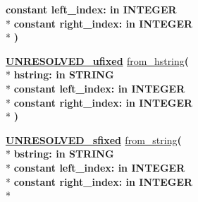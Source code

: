 \begin{DoxyCompactItemize}
{\bfseries {\bfseries \textcolor{keywordflow}{constant}\textcolor{vhdlchar}{ }}\textcolor{vhdlchar}{left\+\_\+index\+: }\textcolor{stringliteral}{in }{\bfseries \textcolor{comment}{I\+N\+T\+E\+G\+E\+R}\textcolor{vhdlchar}{ }}}\\*
{\bfseries {\bfseries \textcolor{keywordflow}{constant}\textcolor{vhdlchar}{ }}\textcolor{vhdlchar}{right\+\_\+index\+: }\textcolor{stringliteral}{in }{\bfseries \textcolor{comment}{I\+N\+T\+E\+G\+E\+R}\textcolor{vhdlchar}{ }}}\\*
{\bfseries  )} 
\item 
{\bfseries {\bfseries {\bfseries \hyperlink{classfixed__pkg_ae78bc2b36d22f6abeac163955e8a587d}{U\+N\+R\+E\+S\+O\+L\+V\+E\+D\+\_\+ufixed}} \textcolor{vhdlchar}{ }}} \hyperlink{classfixed__pkg_a2b8346249788ae734131b93a72b6529e}{from\+\_\+hstring}{\bfseries  ( }\\*
{\bfseries \textcolor{vhdlchar}{hstring\+: }\textcolor{stringliteral}{in }{\bfseries \textcolor{comment}{S\+T\+R\+I\+N\+G}\textcolor{vhdlchar}{ }}}\\*
{\bfseries {\bfseries \textcolor{keywordflow}{constant}\textcolor{vhdlchar}{ }}\textcolor{vhdlchar}{left\+\_\+index\+: }\textcolor{stringliteral}{in }{\bfseries \textcolor{comment}{I\+N\+T\+E\+G\+E\+R}\textcolor{vhdlchar}{ }}}\\*
{\bfseries {\bfseries \textcolor{keywordflow}{constant}\textcolor{vhdlchar}{ }}\textcolor{vhdlchar}{right\+\_\+index\+: }\textcolor{stringliteral}{in }{\bfseries \textcolor{comment}{I\+N\+T\+E\+G\+E\+R}\textcolor{vhdlchar}{ }}}\\*
{\bfseries  )} 
\item 
{\bfseries {\bfseries {\bfseries \hyperlink{classfixed__pkg_aa723b28a027c3c0f9bca02d75e8df4d6}{U\+N\+R\+E\+S\+O\+L\+V\+E\+D\+\_\+sfixed}} \textcolor{vhdlchar}{ }}} \hyperlink{classfixed__pkg_a593418ad4a048a688bec13ffd5de25ce}{from\+\_\+string}{\bfseries  ( }\\*
{\bfseries \textcolor{vhdlchar}{bstring\+: }\textcolor{stringliteral}{in }{\bfseries \textcolor{comment}{S\+T\+R\+I\+N\+G}\textcolor{vhdlchar}{ }}}\\*
{\bfseries {\bfseries \textcolor{keywordflow}{constant}\textcolor{vhdlchar}{ }}\textcolor{vhdlchar}{left\+\_\+index\+: }\textcolor{stringliteral}{in }{\bfseries \textcolor{comment}{I\+N\+T\+E\+G\+E\+R}\textcolor{vhdlchar}{ }}}\\*
{\bfseries {\bfseries \textcolor{keywordflow}{constant}\textcolor{vhdlchar}{ }}\textcolor{vhdlchar}{right\+\_\+index\+: }\textcolor{stringliteral}{in }{\bfseries \textcolor{comment}{I\+N\+T\+E\+G\+E\+R}\textcolor{vhdlchar}{ }}}\\*

\end{DoxyCompactItemize}

